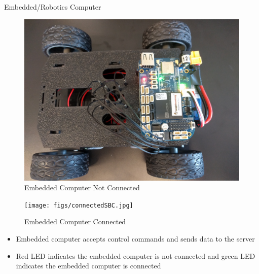 \documentclass{beamer}
\begin{document}
\begin{frame}{Embedded/Robotics Computer}{} %
    \begin{multicols}{2}
        \begin{figure}
            \centering
            \includegraphics[scale=0.04]{figs/notConnectedSBC.jpg}
            \caption{Embedded Computer Not Connected}
            \label{fig:not_connected_bb}
        \end{figure}
        
        \begin{figure}
            \centering
            \texttt{[image: figs/connectedSBC.jpg]}
            \caption{Embedded Computer Connected}
            \label{fig:connected_bb}
        \end{figure}
    \end{multicols}
    \begin{small}
        \begin{itemize}
            \item Embedded computer accepts control commands and sends data to the server
            \item Red LED indicates the embedded computer is not connected and green LED indicates the embedded computer is connected
        \end{itemize}
    \end{small}
\end{frame}

\end{document}
